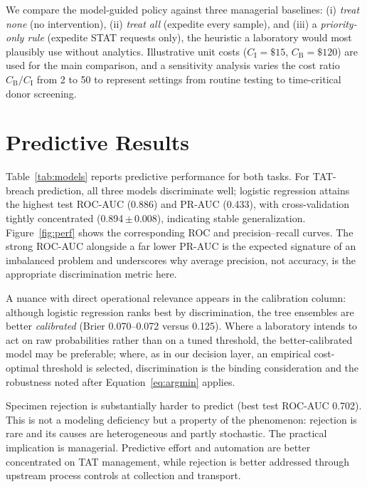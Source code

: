 \documentclass[journal]{IEEEtran}
\begin{document}
We compare the model-guided policy against three managerial baselines: (i)
\emph{treat none} (no intervention), (ii) \emph{treat all} (expedite every
sample), and (iii) a \emph{priority-only rule} (expedite STAT requests only), the
heuristic a laboratory would most plausibly use without analytics. Illustrative
unit costs ($C_{\mathrm{I}}=\$15$, $C_{\mathrm{B}}=\$120$) are used for the main
comparison, and a sensitivity analysis varies the cost ratio
$C_{\mathrm{B}}/C_{\mathrm{I}}$ from 2 to 50 to represent settings from routine
testing to time-critical donor screening.

\section{Predictive Results}\label{sec:results}
Table~\ref{tab:models} reports predictive performance for both tasks.
For TAT-breach prediction, all three models discriminate well; logistic regression
attains the highest test ROC-AUC (0.886) and PR-AUC (0.433), with cross-validation
tightly concentrated (0.894\,$\pm$\,0.008), indicating stable generalization.
Figure~\ref{fig:perf} shows the corresponding ROC and precision--recall curves.
The strong ROC-AUC alongside a far lower PR-AUC is the expected signature of an
imbalanced problem and underscores why average precision, not accuracy, is the
appropriate discrimination metric here.

A nuance with direct operational relevance appears in the calibration column:
although logistic regression ranks best by discrimination, the tree ensembles are
better \emph{calibrated} (Brier 0.070--0.072 versus 0.125). Where a laboratory
intends to act on raw probabilities rather than on a tuned threshold, the
better-calibrated model may be preferable; where, as in our decision layer, an
empirical cost-optimal threshold is selected, discrimination is the binding
consideration and the robustness noted after Equation~\eqref{eq:argmin} applies.

Specimen rejection is substantially harder to predict (best test ROC-AUC 0.702).
This is not a modeling deficiency but a property of the phenomenon: rejection is
rare and its causes are heterogeneous and partly stochastic. The practical
implication is managerial. Predictive effort and automation are better
concentrated on TAT management, while rejection is better addressed through
upstream process controls at collection and transport.
\end{document}
